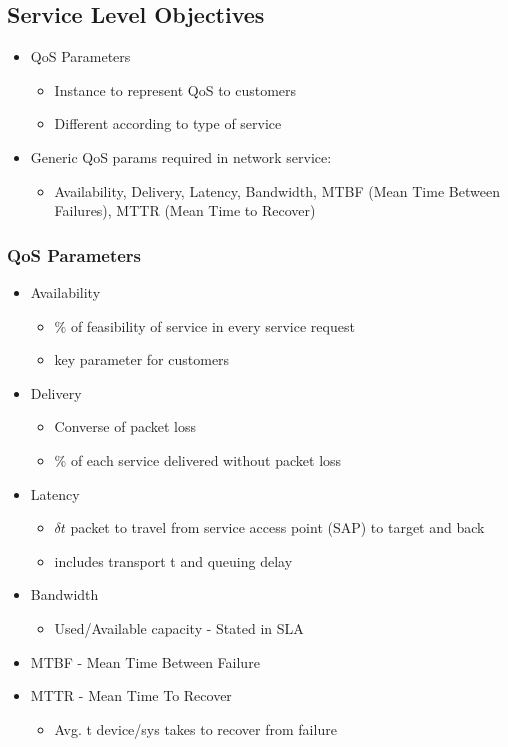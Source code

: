 \documentclass[a4paper]{article}
\begin{document}
\subsection{Service Level Objectives}
\begin{itemize}
	\item QoS Parameters
	\begin{itemize}
		\item Instance to represent QoS to customers
		\item Different according to type of service
	\end{itemize}
	\item Generic QoS params required in network service:
	\begin{itemize}
		\item Availability, Delivery, Latency, Bandwidth, MTBF (Mean
			Time Between Failures), MTTR (Mean Time to Recover)
	\end{itemize}
\end{itemize}
\subsubsection{QoS Parameters}
\begin{itemize}
	\item Availability
	\begin{itemize}
		\item $\%$ of feasibility of service in every service request
		\item key parameter for customers
	\end{itemize}
\item Delivery
	\begin{itemize}
		\item Converse of packet loss
		\item $\%$ of each service delivered without packet loss
	\end{itemize}
\item Latency
	\begin{itemize}
		\item $\delta t$ packet to travel from service access point
			(SAP) to target and back
		\item includes transport t and queuing delay
	\end{itemize}
\item Bandwidth
	\begin{itemize}
		\item Used/Available capacity - Stated in SLA
	\end{itemize}
\item MTBF - Mean Time Between Failure
\item MTTR - Mean Time To Recover
	\begin{itemize}
		\item Avg. t device/sys takes to recover from failure
	\end{itemize}
\end{itemize}
\end{document}

